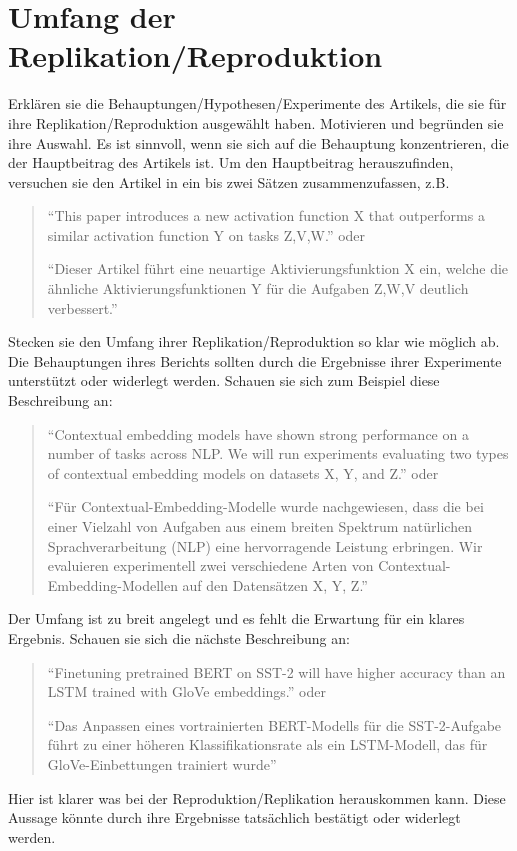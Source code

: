 \documentclass[DIV=13,fontsize=11pt]{scrartcl}
\begin{document}
\section{Umfang der Replikation/Reproduktion}
Erklären sie die Behauptungen/Hypothesen/Experimente des Artikels, die sie für ihre Replikation/Reproduktion ausgewählt haben.
Motivieren und begründen sie ihre Auswahl. 
Es ist sinnvoll, wenn sie sich auf die Behauptung konzentrieren, die der Hauptbeitrag des Artikels ist.
Um den Hauptbeitrag herauszufinden, versuchen sie den Artikel in ein bis zwei Sätzen zusammenzufassen, z.B.
\begin{quote}
    ``This paper introduces a new activation function X that outperforms a similar activation function Y on tasks Z,V,W.''  oder 
    
    ``Dieser Artikel führt eine neuartige Aktivierungsfunktion X ein, welche die ähnliche Aktivierungsfunktionen Y für die Aufgaben Z,W,V deutlich verbessert.''
\end{quote}
Stecken sie den Umfang ihrer Replikation/Reproduktion so klar wie möglich ab. 
Die Behauptungen ihres Berichts sollten durch die Ergebnisse ihrer Experimente unterstützt oder widerlegt werden.
Schauen sie sich zum Beispiel diese Beschreibung an:
\begin{quote}
    ``Contextual embedding models have shown strong performance on a number of tasks across NLP. We will run experiments evaluating two types of contextual embedding models on datasets X, Y, and Z.'' oder 
    
    ``Für Contextual-Embedding-Modelle wurde nachgewiesen, dass die bei einer Vielzahl von Aufgaben aus einem breiten Spektrum natürlichen Sprachverarbeitung (NLP) eine hervorragende Leistung erbringen. Wir evaluieren experimentell zwei verschiedene Arten von Contextual-Embedding-Modellen auf den Datensätzen X, Y, Z.''    
\end{quote}
Der Umfang ist zu breit angelegt und es fehlt die Erwartung für ein klares Ergebnis.
Schauen sie sich die nächste Beschreibung an:
\begin{quote}
``Finetuning pretrained BERT on SST-2 will have higher accuracy than an LSTM trained with GloVe embeddings.'' oder

``Das Anpassen eines vortrainierten BERT-Modells für die SST-2-Aufgabe führt zu einer höheren Klassifikationsrate als ein LSTM-Modell, das für GloVe-Einbettungen trainiert wurde''
\end{quote}
Hier ist klarer was bei der Reproduktion/Replikation herauskommen kann. Diese Aussage könnte durch ihre Ergebnisse tatsächlich bestätigt oder widerlegt werden. 
\end{document}
